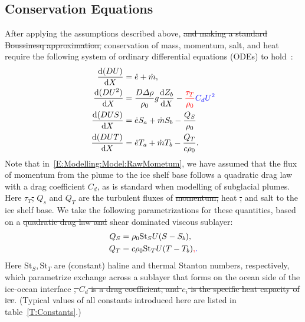 \documentclass[openacc]{rsproca_new}%
\newcommand{\dd}[2]{\frac{\mathrm{d} #1}{\mathrm{d} #2}}
\newcommand{\red}[1]{{\color{red} #1}}
\newcommand{\blue}[1]{{\color{blue} #1}}
\newcommand{\rout}[1]{\red{\st{#1}}}\newcommand{\ab}[1]{\textcolor{Green}{#1}}\newcommand{\about}[1]{\textcolor{Cyan}{\sout{#1}}}
\begin{document}
\subsection{Conservation Equations} 
After applying the assumptions described above,\rout{ and making a standard Boussinesq approximation,} conservation of mass, momentum, salt, and heat require the following system of ordinary differential equations (ODEs) to hold~\cite{Jenkins2011JPhysOcean,Magorrian2016JGeoResOcean}:
\begin{align}
\dd{(DU)}{X} &= \dot{e} + \dot{m},\label{E:Modelling:Model:RawMass}\\
\dd{(DU^2)}{X} &= \frac{D\Delta \rho}{\rho_0} g \dd{Z_b}{X}  -\red{\frac{\tau_T}{\rho_0}} \blue{C_d U^2}\label{E:Modelling:Model:RawMometum}\\
\dd{(DUS)}{X} &= \dot{e}S_a + \dot{m}S_b -\frac{Q_S}{\rho_0}\label{E:Modelling:Model:RawSalt}\\
\dd{(DUT)}{X} &= \dot{e}T_a + \dot{m}T_b -\frac{Q_T}{c \rho_0}.\label{E:Modelling:Model:RawTemp}
\end{align}
\blue{Note that in~\eqref{E:Modelling:Model:RawMometum}, we have assumed that the flux of momentum from the plume to the ice shelf base follows a quadratic drag law with a drag coefficient $C_d$, as is standard when modelling of subglacial plumes.} Here\rout{ $\tau_T$,} $Q_s$ and $Q_T$ are the turbulent fluxes of\rout{ momentum,} heat\rout{,} and salt to the ice shelf base. We take the following parametrizations for these quantities, based on a\rout{ quadratic drag law and} shear dominated viscous sublayer:
\begin{align}
Q_S &= \rho_0 \mathrm{St}_S U (S - S_b),\label{E:Modelling:Model:TurbulentSalt} \\
Q_T &= c \rho_0 \mathrm{St}_T U (T -T_b)\red{,}\blue{.}\label{E:Modelling:Model:TurbulentHeat}
\end{align}
Here $\mathrm{St}_S, \mathrm{St}_T$ are (constant) haline and thermal Stanton numbers, respectively, which parametrize exchange across a sublayer that forms on the ocean side of the ice-ocean interface\rout{, $C_d$ is a drag coefficient, and $c_i$ is the specific heat capacity of ice}. (Typical values of all constants introduced here are listed in table~\ref{T:Constants}.)
\end{document}
